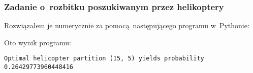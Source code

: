 \subsubsection*{Zadanie o~rozbitku poszukiwanym przez helikoptery}
Rozwiązałem je numerycznie za pomocą następującego programu w~Pythonie:

Oto wynik programu:
\begin{lstlisting}
Optimal helicopter partition (15, 5) yields probability 0.26429773960448416
\end{lstlisting}
